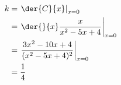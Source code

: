 \documentclass{jhwhw}
\begin{document}
            \begin{equation*}
                \begin{aligned}
                    k &= \left.\der{C}{x}\right|_{x=0}\\
                    &= \left.\der{}{x}\dfrac{x}{x^2-5x+4}\right|_{x=0} \\
                    &= \left.\dfrac{3x^2-10x+4}{(x^2-5x+4)^2}\right|_{x=0} \\
                    &= \dfrac14
                \end{aligned}
            \end{equation*}

\end{document}
